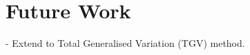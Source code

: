 \documentclass[12pt]{article}
\begin{document}



\section{Future Work}






- Extend to Total Generalised Variation (TGV) method.






\end{document}
